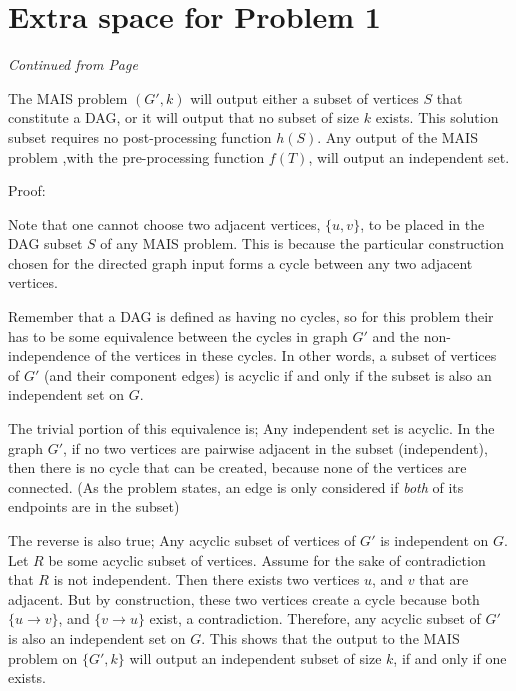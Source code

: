 \documentclass[11pt]{article}
\begin{document}
\label{pg:end-of-p5}


\newpage
  
\section*{Extra space for Problem 1}
\emph{Continued from Page \pageref{pg:end-of-p1}}


\label{pg:p1-continuation}

  The MAIS problem $(G',k)$ will output either a subset of vertices $S$ that constitute
  a DAG, or it will output that no subset of size $k$ exists. This solution subset
  requires no post-processing function $h(S)$. Any output of the MAIS problem 
  ,with the pre-processing function $f(T)$, will output an independent set. 
  
  Proof: 

  Note that one cannot choose two adjacent vertices, $\{u,v\}$,
  to be placed in the DAG subset $S$ of any MAIS problem. 
  This is because the particular
  construction chosen for the directed graph input forms a cycle between any two
  adjacent vertices. 

  Remember that a DAG is defined as having no cycles, so for this problem
  their has to be some equivalence between the cycles in graph $G'$ and 
  the non-independence of the vertices in these cycles. In other words, 
  a subset of vertices of $G'$ (and their component edges) is acyclic if and only if the subset
  is also an independent set on $G$. 
  
  The trivial portion of this equivalence is; Any independent set is acyclic. 
  In the graph $G'$, if no two vertices are pairwise adjacent in the subset (independent),
  then there is no cycle that can be created, because none of the vertices are connected. 
  (As the problem states, an edge is only considered if \emph{both} of its endpoints are in the subset)
  
  The reverse is also true; Any acyclic subset of vertices of $G'$ is independent on $G$.
  Let $R$ be some acyclic subset of vertices. Assume for the sake of contradiction that $R$ is not independent. 
  Then there exists two vertices $u$, and $v$ that are adjacent. But by construction, these two 
  vertices create a cycle because both  $\{u \rightarrow v\}$, and $\{v \rightarrow u\}$ exist, a contradiction.
  Therefore, any acyclic subset of $G'$ is also an independent set on $G$. This shows
  that the output to the MAIS problem on $\{G',k\}$ will output an independent subset of size $k$,
  if and only if one exists.
   
\end{document}
